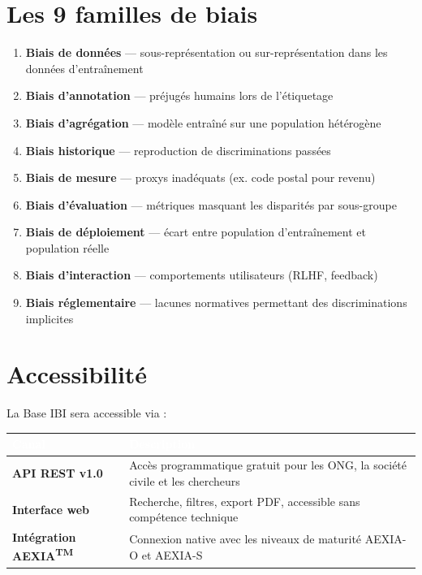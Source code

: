 \documentclass[11pt,a4paper,openany]{book}
\begin{document}
\section{Les 9 familles de biais}

\begin{enumerate}[leftmargin=1.5em]
  \item \textbf{Biais de données} — sous-représentation ou sur-représentation dans les données d'entraînement
  \item \textbf{Biais d'annotation} — préjugés humains lors de l'étiquetage
  \item \textbf{Biais d'agrégation} — modèle entraîné sur une population hétérogène
  \item \textbf{Biais historique} — reproduction de discriminations passées
  \item \textbf{Biais de mesure} — proxys inadéquats (ex. code postal pour revenu)
  \item \textbf{Biais d'évaluation} — métriques masquant les disparités par sous-groupe
  \item \textbf{Biais de déploiement} — écart entre population d'entraînement et population réelle
  \item \textbf{Biais d'interaction} — comportements utilisateurs (RLHF, feedback)
  \item \textbf{Biais réglementaire} — lacunes normatives permettant des discriminations implicites
\end{enumerate}

\section{Accessibilité}

La Base IBI sera accessible via :

\begin{center}
\renewcommand{\arraystretch}{1.3}
\begin{tabularx}{\textwidth}{@{}>{\bfseries}p{3.5cm}X@{}}
\toprule
\rowcolor{navy}
\textcolor{white}{Canal} & \textcolor{white}{Description} \\
\midrule
\textbf{API REST v1.0} & Accès programmatique gratuit pour les ONG, la société civile et les chercheurs \\
\rowcolor{light}
\textbf{Interface web} & Recherche, filtres, export PDF, accessible sans compétence technique \\
\textbf{Intégration AEXIA\textsuperscript{TM}} & Connexion native avec les niveaux de maturité AEXIA-O et AEXIA-S \\
\bottomrule
\end{tabularx}
\end{center}
\end{document}
